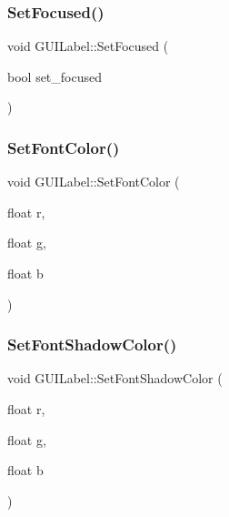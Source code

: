 \hypertarget{class_g_u_i_label_a77cfcc05ceba3308ac2ceb693aa03077}{}\label{class_g_u_i_label_a77cfcc05ceba3308ac2ceb693aa03077} 
\subsubsection{\texorpdfstring{Set\+Focused()}{SetFocused()}}
{\footnotesize\ttfamily void G\+U\+I\+Label\+::\+Set\+Focused (\begin{DoxyParamCaption}\item[{bool}]{set\+\_\+focused }\end{DoxyParamCaption})}

\hypertarget{class_g_u_i_label_a3977539863dc36bd534219daa63a991c}{}\label{class_g_u_i_label_a3977539863dc36bd534219daa63a991c} 
\subsubsection{\texorpdfstring{Set\+Font\+Color()}{SetFontColor()}}
{\footnotesize\ttfamily void G\+U\+I\+Label\+::\+Set\+Font\+Color (\begin{DoxyParamCaption}\item[{float}]{r,  }\item[{float}]{g,  }\item[{float}]{b }\end{DoxyParamCaption})}

\hypertarget{class_g_u_i_label_a003028d9e94f6d52a538595f92d90397}{}\label{class_g_u_i_label_a003028d9e94f6d52a538595f92d90397} 
\subsubsection{\texorpdfstring{Set\+Font\+Shadow\+Color()}{SetFontShadowColor()}}
{\footnotesize\ttfamily void G\+U\+I\+Label\+::\+Set\+Font\+Shadow\+Color (\begin{DoxyParamCaption}\item[{float}]{r,  }\item[{float}]{g,  }\item[{float}]{b }\end{DoxyParamCaption})}

